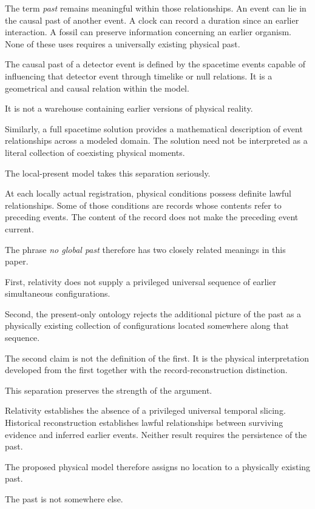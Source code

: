 \documentclass[12pt,onecolumn]{article}
\begin{document}
The term \emph{past} remains meaningful within those relationships. An event can lie in the causal past of another event. A clock can record a duration since an earlier interaction. A fossil can preserve information concerning an earlier organism. None of these uses requires a universally existing physical past.

The causal past of a detector event is defined by the spacetime events capable of influencing that detector event through timelike or null relations. It is a geometrical and causal relation within the model.

It is not a warehouse containing earlier versions of physical reality.

Similarly, a full spacetime solution provides a mathematical description of event relationships across a modeled domain. The solution need not be interpreted as a literal collection of coexisting physical moments.

The local-present model takes this separation seriously.

At each locally actual registration, physical conditions possess definite lawful relationships. Some of those conditions are records whose contents refer to preceding events. The content of the record does not make the preceding event current.

The phrase \emph{no global past} therefore has two closely related meanings in this paper.

First, relativity does not supply a privileged universal sequence of earlier simultaneous configurations.

Second, the present-only ontology rejects the additional picture of the past as a physically existing collection of configurations located somewhere along that sequence.

The second claim is not the definition of the first. It is the physical interpretation developed from the first together with the record-reconstruction distinction.

This separation preserves the strength of the argument.

Relativity establishes the absence of a privileged universal temporal slicing. Historical reconstruction establishes lawful relationships between surviving evidence and inferred earlier events. Neither result requires the persistence of the past.

The proposed physical model therefore assigns no location to a physically existing past.

The past is not somewhere else.
\end{document}
